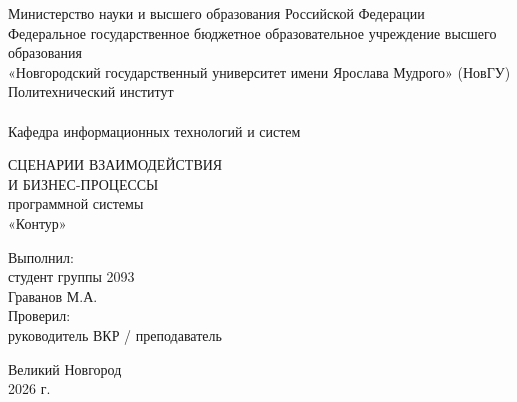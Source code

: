 \begin{titlepage}
\begin{center}

Министерство науки и высшего образования Российской Федерации
\\
Федеральное государственное бюджетное образовательное учреждение 
высшего образования
\\
«Новгородский государственный университет имени Ярослава Мудрого» (НовГУ)
\\
Политехнический институт
\\
\tiny\underline{\hspace{16cm}}
\\
\normalsize \lsstyle Кафедра информационных технологий и систем
\\
\end{center}

\vspace*{25mm}

\begin{center}
СЦЕНАРИИ ВЗАИМОДЕЙСТВИЯ
\\
И БИЗНЕС-ПРОЦЕССЫ
\\
программной системы
\\
«Контур»
\\
\end{center}

\vspace*{20mm}

\begin{flushright}
\begin{minipage}[t]{0.52\textwidth}
Выполнил:
\\
студент группы 2093
\\
Граванов М.А.
\\
Проверил:
\\
руководитель ВКР / преподаватель
\\
\underline{\hspace{55mm}}
\end{minipage}
\end{flushright}

\vfill

\begin{center}
Великий Новгород
\\
2026 г.
\end{center}
\end{titlepage}
\restoregeometry
\addtocounter{page}{1}
